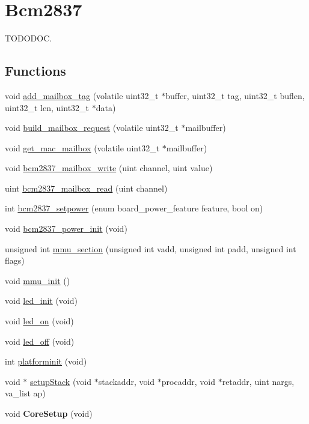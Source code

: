 \hypertarget{group__bcm2837}{\section{Bcm2837}
\label{group__bcm2837}
}


T\-O\-D\-O\-D\-O\-C.  


\subsection*{Functions}
\begin{DoxyCompactItemize}
\item 
void \hyperlink{group__bcm2837_ga556fc5ad8b59adb57df58404e85efe8f}{add\-\_\-mailbox\-\_\-tag} (volatile uint32\-\_\-t $\ast$buffer, uint32\-\_\-t tag, uint32\-\_\-t buflen, uint32\-\_\-t len, uint32\-\_\-t $\ast$data)
\item 
void \hyperlink{group__bcm2837_ga3bdf72a46b4f0bdae32864267c39c2d8}{build\-\_\-mailbox\-\_\-request} (volatile uint32\-\_\-t $\ast$mailbuffer)
\item 
void \hyperlink{group__bcm2837_ga2aa4bfcc808a4bb452a90c63426e2505}{get\-\_\-mac\-\_\-mailbox} (volatile uint32\-\_\-t $\ast$mailbuffer)
\item 
void \hyperlink{group__bcm2837_ga560d6c2a9ab56136a3219b1aceaca531}{bcm2837\-\_\-mailbox\-\_\-write} (uint channel, uint value)
\item 
uint \hyperlink{group__bcm2837_gaf3a135e92d25f12cae0cc9c4e380c2e0}{bcm2837\-\_\-mailbox\-\_\-read} (uint channel)
\item 
int \hyperlink{group__bcm2837_gad5db106cf15f544accbdeb02ed89894a}{bcm2837\-\_\-setpower} (enum board\-\_\-power\-\_\-feature feature, bool on)
\item 
void \hyperlink{group__bcm2837_gad1cb830ad707715e909b54abc6f8d9d5}{bcm2837\-\_\-power\-\_\-init} (void)
\item 
unsigned int \hyperlink{group__bcm2837_gaba27187e9e8c347b2f7e2f3d1eeafe83}{mmu\-\_\-section} (unsigned int vadd, unsigned int padd, unsigned int flags)
\item 
void \hyperlink{group__bcm2837_gabd7eba8cae99b9fb84685567d7f35242}{mmu\-\_\-init} ()
\item 
void \hyperlink{group__bcm2837_ga7eb4d382bdd4b42c57dbb7154d03ac66}{led\-\_\-init} (void)
\item 
void \hyperlink{group__bcm2837_ga801936b261245054eb570e040642818a}{led\-\_\-on} (void)
\item 
void \hyperlink{group__bcm2837_ga429f05b7eac928971c19e37ddc7079be}{led\-\_\-off} (void)
\item 
int \hyperlink{group__bcm2837_gab8f68c443b71713640467ae1be1228f1}{platforminit} (void)
\item 
void $\ast$ \hyperlink{group__bcm2837_gabd29847cfed983d7133858e65fc2d146}{setup\-Stack} (void $\ast$stackaddr, void $\ast$procaddr, void $\ast$retaddr, uint nargs, va\-\_\-list ap)
\item 
\hypertarget{group__bcm2837_gaba2a41b7c6a7714a97247c273185b45a}{void {\bfseries Core\-Setup} (void)}\label{group__bcm2837_gaba2a41b7c6a7714a97247c273185b45a}


\end{DoxyCompactItemize}

